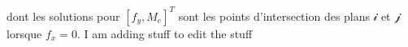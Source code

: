 dont les solutions pour $[f_y,M_e]^T$ sont les points d'intersection des plans $\mathcal{i}$ et $\mathcal{j}$ lorsque $f_x=0$. I am adding stuff to edit the stuff
